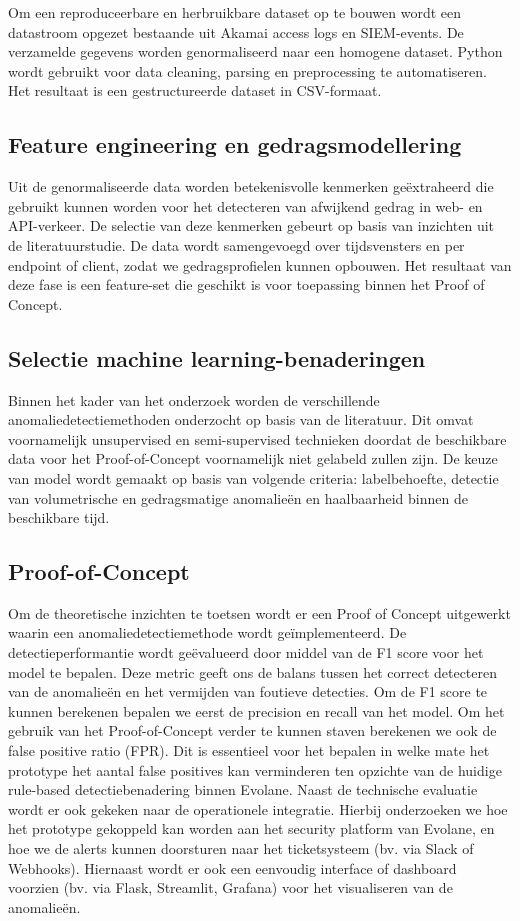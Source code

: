 Om een reproduceerbare en herbruikbare dataset op te bouwen wordt een datastroom opgezet bestaande uit Akamai access logs en SIEM-events. De verzamelde gegevens worden genormaliseerd naar een homogene dataset. Python wordt gebruikt voor data cleaning, parsing en preprocessing te automatiseren. Het resultaat is een gestructureerde dataset in CSV-formaat.

\subsection{Feature engineering en gedragsmodellering}

Uit de genormaliseerde data worden betekenisvolle kenmerken geëxtraheerd die gebruikt kunnen worden voor het detecteren van afwijkend gedrag in web- en API-verkeer. De selectie van deze kenmerken gebeurt op basis van inzichten uit de literatuurstudie. De data wordt samengevoegd over tijdsvensters en per endpoint of client, zodat we gedragsprofielen kunnen opbouwen. Het resultaat van deze fase is een feature-set die geschikt is voor toepassing binnen het Proof of Concept. 

\subsection{Selectie machine learning-benaderingen}

Binnen het kader van het onderzoek worden de verschillende anomaliedetectiemethoden onderzocht op basis van de literatuur. Dit omvat voornamelijk unsupervised en semi-supervised technieken doordat de beschikbare data voor het Proof-of-Concept voornamelijk niet gelabeld zullen zijn. De keuze van model wordt gemaakt op basis van volgende criteria: labelbehoefte, detectie van volumetrische en gedragsmatige anomalieën en haalbaarheid binnen de beschikbare tijd. 

\subsection{Proof-of-Concept}
Om de theoretische inzichten te toetsen wordt er een Proof of Concept uitgewerkt waarin een anomaliedetectiemethode wordt geïmplementeerd. De detectieperformantie wordt geëvalueerd door middel van de F1 score voor het model te bepalen. Deze metric geeft ons de balans tussen het correct detecteren van de anomalieën en het vermijden van foutieve detecties. Om de F1 score te kunnen berekenen bepalen we eerst de precision en recall van het model. Om het gebruik van het Proof-of-Concept verder te kunnen staven berekenen we ook de false positive ratio (FPR). Dit is essentieel voor het bepalen in welke mate het prototype het aantal false positives kan verminderen ten opzichte van de huidige rule-based detectiebenadering binnen Evolane. Naast de technische evaluatie wordt er ook gekeken naar de operationele integratie. Hierbij onderzoeken we hoe het prototype gekoppeld kan worden aan het security platform van Evolane, en hoe we de alerts kunnen doorsturen naar het ticketsysteem (bv. via Slack of Webhooks). Hiernaast wordt er ook een eenvoudig interface of dashboard voorzien (bv. via Flask, Streamlit, Grafana) voor het visualiseren van de anomalieën.  

